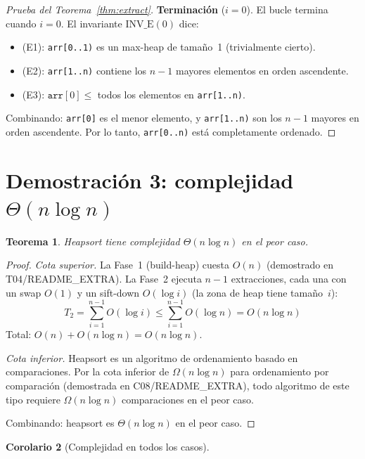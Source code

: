 \documentclass[11pt, letterpaper]{article}
\theoremstyle{definition}
\theoremstyle{plain}
\newtheorem{theorem}{Teorema}[section]
\newtheorem{corollary}[theorem]{Corolario}
\theoremstyle{remark}
\begin{document}
\begin{proof}[Prueba del Teorema~\ref{thm:extract}]
\textbf{Terminación} ($i = 0$). El bucle termina cuando $i = 0$.
El invariante $\text{INV\_E}(0)$ dice:
\begin{itemize}
  \item (E1): \texttt{arr[0..1)} es un max-heap de tamaño~1
    (trivialmente cierto).
  \item (E2): \texttt{arr[1..n)} contiene los $n-1$ mayores elementos
    en orden ascendente.
  \item (E3): $\texttt{arr}[0] \leq$ todos los elementos en
    \texttt{arr[1..n)}.
\end{itemize}

Combinando: \texttt{arr[0]} es el menor elemento, y \texttt{arr[1..n)}
son los $n-1$ mayores en orden ascendente. Por lo tanto,
\texttt{arr[0..n)} está completamente ordenado.
\end{proof}

\section{Demostración 3: complejidad
  \texorpdfstring{$\Theta(n \log n)$}{Theta(n log n)}}

\begin{theorem}\label{thm:complexity}
Heapsort tiene complejidad $\Theta(n \log n)$ en el peor caso.
\end{theorem}

\begin{proof}
\emph{Cota superior.} La Fase~1 (build-heap) cuesta $O(n)$ (demostrado
en T04/README\_EXTRA). La Fase~2 ejecuta $n-1$ extracciones, cada una
con un swap $O(1)$ y un sift-down $O(\log i)$ (la zona de heap tiene
tamaño~$i$):
\[
  T_2 = \sum_{i=1}^{n-1} O(\log i)
  \leq \sum_{i=1}^{n-1} O(\log n) = O(n \log n)
\]
Total: $O(n) + O(n \log n) = O(n \log n)$.

\emph{Cota inferior.} Heapsort es un algoritmo de ordenamiento basado
en comparaciones. Por la cota inferior de $\Omega(n \log n)$ para
ordenamiento por comparación (demostrada en C08/README\_EXTRA), todo
algoritmo de este tipo requiere $\Omega(n \log n)$ comparaciones en el
peor caso.

Combinando: heapsort es $\Theta(n \log n)$ en el peor caso.
\end{proof}

\begin{corollary}[Complejidad en todos los casos]
\mbox{}
\end{corollary}
\end{document}
